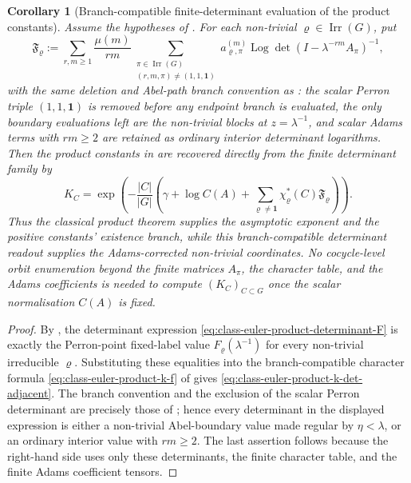 \documentclass[11pt,a4paper]{amsart}
\theoremstyle{plain}
\newtheorem{corollary}[theorem]{Corollary}
\theoremstyle{definition}
\theoremstyle{remark}
\DeclareMathOperator{\Irr}{Irr}
\DeclareMathOperator{\Log}{Log}
\begin{document}
\begin{corollary}[Branch-compatible finite-determinant evaluation of the product constants]
  \label{cor:class-euler-product-determinant-evaluation}
  Assume the hypotheses of .  For each
  non-trivial \(\varrho\in\Irr(G)\), put
  \begin{equation}\label{eq:class-euler-product-determinant-F}
    \mathfrak F_\varrho:=
    \sum_{r,m\ge1}\frac{\mu(m)}{rm}
      \sum_{\substack{\pi\in\Irr(G)\\(r,m,\pi)\neq(1,1,\mathbf1)}}
        a_{\varrho,\pi}^{(m)}
        \Log\det(I-\lambda^{-rm}A_\pi)^{-1},
  \end{equation}
  with the same deletion and Abel-path branch convention as
  : the scalar Perron triple
  \((1,1,\mathbf1)\) is removed before any endpoint branch is evaluated, the
  only boundary evaluations left are the non-trivial blocks at
  \(z=\lambda^{-1}\), and scalar Adams terms with \(rm\ge2\) are retained as
  ordinary interior determinant logarithms.  Then the product constants in
   are recovered directly from the
  finite determinant family by
  \begin{equation}\label{eq:class-euler-product-k-det-adjacent}
    K_C=
    \exp\!\left(
      -\frac{|C|}{|G|}
      \left(
        \gamma+\log C(A)
        +\sum_{\varrho\neq\mathbf1}
          \chi_\varrho^\ast(C)\mathfrak F_\varrho
      \right)
    \right).
  \end{equation}
  Thus the classical product theorem supplies the asymptotic exponent and the
  positive constants' existence branch, while this branch-compatible determinant
  readout supplies the Adams-corrected non-trivial coordinates.  No
  cocycle-level orbit enumeration beyond the finite matrices \(A_\pi\), the
  character table, and the Adams coefficients is needed to compute
  \((K_C)_{C\subset G}\) once the scalar normalisation \(C(A)\) is fixed.
\end{corollary}

\begin{proof}
  By , the determinant expression
  \eqref{eq:class-euler-product-determinant-F} is exactly the Perron-point
  fixed-label value \(F_\varrho(\lambda^{-1})\) for every non-trivial
  irreducible \(\varrho\).  Substituting these equalities into the
  branch-compatible character formula
  \eqref{eq:class-euler-product-k-f} of
   gives
  \eqref{eq:class-euler-product-k-det-adjacent}.  The branch convention and
  the exclusion of the scalar Perron determinant are precisely those of
  ; hence every determinant in
  the displayed expression is either a non-trivial Abel-boundary value made
  regular by \(\eta<\lambda\), or an ordinary interior value with
  \(rm\ge2\).  The last assertion follows because the right-hand side uses
  only these determinants, the finite character table, and the finite Adams
  coefficient tensors.
\end{proof}
\end{document}
